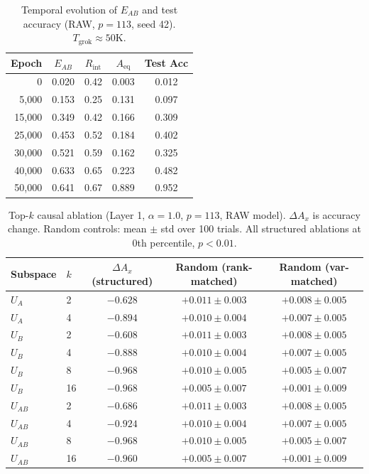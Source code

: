 \documentclass[11pt,a4paper]{article}
\theoremstyle{definition}
\theoremstyle{remark}
\newcommand{\EAB}{E_{AB}}
\newcommand{\Rint}{R_{\mathrm{int}}}
\newcommand{\Aeq}{A_{\mathrm{eq}}}
\begin{document}
\begin{table}[h]
\centering
\caption{Temporal evolution of $\EAB$ and test accuracy (RAW, $p=113$, seed 42). $T_{\mathrm{grok}} \approx 50$K.}
\label{tab:temporal}
\begin{tabular}{rcccc}
\toprule
Epoch & $\EAB$ & $\Rint$ & $\Aeq$ & Test Acc \\
\midrule
0 & 0.020 & 0.42 & 0.003 & 0.012 \\
5,000 & 0.153 & 0.25 & 0.131 & 0.097 \\
15,000 & 0.349 & 0.42 & 0.166 & 0.309 \\
25,000 & 0.453 & 0.52 & 0.184 & 0.402 \\
30,000 & 0.521 & 0.59 & 0.162 & 0.325 \\
40,000 & 0.633 & 0.65 & 0.223 & 0.482 \\
50,000 & 0.641 & 0.67 & 0.889 & 0.952 \\
\bottomrule
\end{tabular}
\end{table}

\begin{table}[h]
\centering
\caption{Top-$k$ causal ablation (Layer 1, $\alpha = 1.0$, $p=113$, RAW model). $\Delta A_x$ is accuracy change. Random controls: mean $\pm$ std over 100 trials. All structured ablations at 0th percentile, $p < 0.01$.}
\label{tab:topk_ablation}
\begin{tabular}{llccc}
\toprule
Subspace & $k$ & $\Delta A_x$ (structured) & Random (rank-matched) & Random (var-matched) \\
\midrule
$U_A$ & 2 & $-0.628$ & $+0.011 \pm 0.003$ & $+0.008 \pm 0.005$ \\
$U_A$ & 4 & $-0.894$ & $+0.010 \pm 0.004$ & $+0.007 \pm 0.005$ \\
$U_B$ & 2 & $-0.608$ & $+0.011 \pm 0.003$ & $+0.008 \pm 0.005$ \\
$U_B$ & 4 & $-0.888$ & $+0.010 \pm 0.004$ & $+0.007 \pm 0.005$ \\
$U_B$ & 8 & $-0.968$ & $+0.010 \pm 0.005$ & $+0.005 \pm 0.007$ \\
$U_B$ & 16 & $-0.968$ & $+0.005 \pm 0.007$ & $+0.001 \pm 0.009$ \\
$U_{AB}$ & 2 & $-0.686$ & $+0.011 \pm 0.003$ & $+0.008 \pm 0.005$ \\
$U_{AB}$ & 4 & $-0.924$ & $+0.010 \pm 0.004$ & $+0.007 \pm 0.005$ \\
$U_{AB}$ & 8 & $-0.968$ & $+0.010 \pm 0.005$ & $+0.005 \pm 0.007$ \\
$U_{AB}$ & 16 & $-0.960$ & $+0.005 \pm 0.007$ & $+0.001 \pm 0.009$ \\
\bottomrule
\end{tabular}
\end{table}
\end{document}
